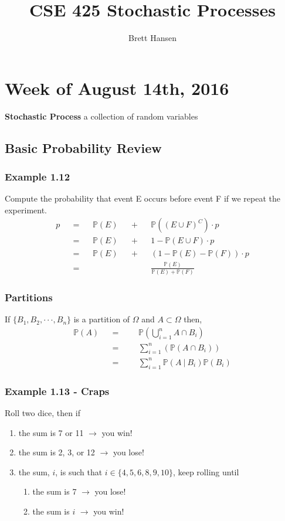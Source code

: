 \documentclass{article}
\title{CSE 425 Stochastic Processes}
\author{Brett Hansen}
\date{}
\newcommand{\ellipse}{\cdot\cdot\cdot}
\newcommand{\ssor}{\ |\ }
\newcommand{\prob}[1]{\mathbb{P}\left(#1\right)}
\newcommand{\conprob}[2]{\prob{#1\ssor#2}}
\begin{document}
\maketitle
\tableofcontents
\break

\section{Week of August 14th, 2016}

\textbf{Stochastic Process} \quad a collection of random variables

\subsection{Basic Probability Review}
\subsubsection{Example 1.12}
Compute the probability that event E occurs before event F if we repeat the experiment.
\begin{align*}
p &&= &&\prob{E} &&+ &&\prob{(E \cup F)^C} \cdot p \\
  &&= &&\prob{E} &&+ &&1 - \prob{E \cup F} \cdot p \\
  &&= &&\prob{E} &&+ &&(1 - \prob{E} - \prob{F}) \cdot p \\
  &&= &&&&&&\frac{\prob{E}}{\prob{E} + \prob{F}}
\end{align*}

\subsubsection{Partitions}
If $\{B_1, B_2, \ellipse, B_n\}$ is a partition of $\Omega$ and $A \subset \Omega$ then,
\begin{align*}
\prob{A} 	&&= &&&\prob{\bigcup_{i=1}^n A \cap B_i} \\
			&&= &&&\sum_{i=1}^n \left(\prob{A \cap B_i}\right) \\
			&&= &&&\sum_{i=1}^n \conprob{A}{B_i}\prob{B_i}
\end{align*}

\subsubsection{Example 1.13 - Craps}
Roll two dice, then if
\begin{enumerate}
	\item the sum is 7 or 11 $\longrightarrow$ you win!
	\item the sum is 2, 3, or 12 $\longrightarrow$ you lose!
	\item the sum, $i$, is such that $i \in \{4, 5, 6, 8, 9, 10\}$, keep rolling until
	\begin{enumerate}
		\item the sum is 7 $\longrightarrow$ you lose!
		\item the sum is $i$ $\longrightarrow$ you win!
	\end{enumerate}
\end{enumerate}
\end{document}
